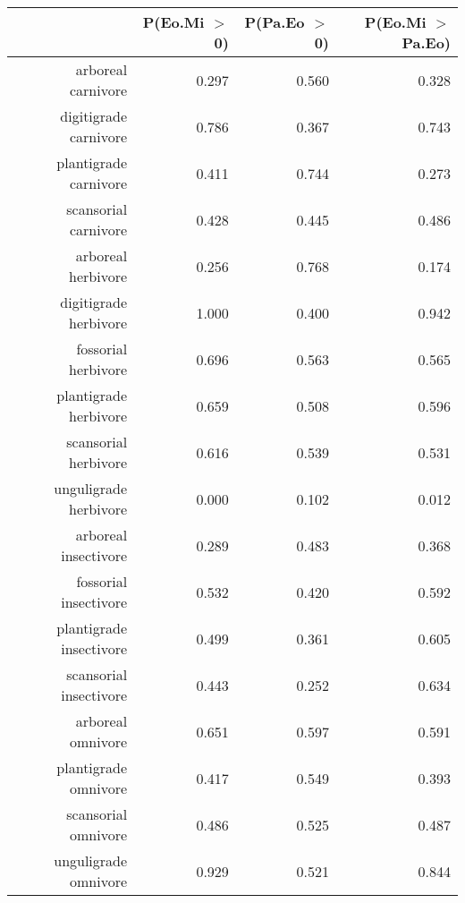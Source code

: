 \begin{table}[ht]
\centering
\begin{tabular}{rrrr}
  \hline
 & P(Eo.Mi $>$ 0) & P(Pa.Eo $>$ 0) & P(Eo.Mi $>$ Pa.Eo) \\ 
  \hline
arboreal carnivore & 0.297 & 0.560 & 0.328 \\ 
  digitigrade carnivore & 0.786 & 0.367 & 0.743 \\ 
  plantigrade carnivore & 0.411 & 0.744 & 0.273 \\ 
  scansorial carnivore & 0.428 & 0.445 & 0.486 \\ 
  arboreal herbivore & 0.256 & 0.768 & 0.174 \\ 
  digitigrade herbivore & 1.000 & 0.400 & 0.942 \\ 
  fossorial herbivore & 0.696 & 0.563 & 0.565 \\ 
  plantigrade herbivore & 0.659 & 0.508 & 0.596 \\ 
  scansorial herbivore & 0.616 & 0.539 & 0.531 \\ 
  unguligrade herbivore & 0.000 & 0.102 & 0.012 \\ 
  arboreal insectivore & 0.289 & 0.483 & 0.368 \\ 
  fossorial insectivore & 0.532 & 0.420 & 0.592 \\ 
  plantigrade insectivore & 0.499 & 0.361 & 0.605 \\ 
  scansorial insectivore & 0.443 & 0.252 & 0.634 \\ 
  arboreal omnivore & 0.651 & 0.597 & 0.591 \\ 
  plantigrade omnivore & 0.417 & 0.549 & 0.393 \\ 
  scansorial omnivore & 0.486 & 0.525 & 0.487 \\ 
  unguligrade omnivore & 0.929 & 0.521 & 0.844 \\ 
   \hline
\end{tabular}
\label{tab:surv_plant}
\end{table}
